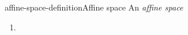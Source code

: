 \documentclass[preview]{standalone}
\begin{document}
\genpage

\begin{snippetdefinition}{affine-space-definition}{Affine space}
    An \emph{affine space}
    \begin{enumerate}
        \item 
    \end{enumerate}
\end{snippetdefinition}
\end{document}
